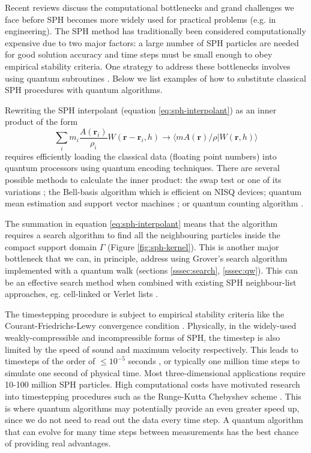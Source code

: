\documentclass[10pt]{iopart}
\begin{document}
Recent reviews \cite{Lind2020,Vacondio2021} discuss the computational bottlenecks and grand challenges we face before SPH becomes more widely used for practical problems (e.g. in engineering). The SPH method has traditionally been considered computationally expensive \cite{Lind2020} due to two major factors: a large number of SPH particles are needed for good solution accuracy and time steps must be small enough to obey empirical stability criteria. One strategy to address these bottlenecks involves using quantum subroutines \cite{AuYeung2024}. Below we list examples of how to substitute classical SPH procedures with quantum algorithms.

Rewriting the SPH interpolant (equation \ref{eq:sph-interpolant}) as an inner product of the form
\begin{equation}
\sum_i m_i \frac{A(\mathbf{r}_i)}{\rho_i} W(\mathbf{r}-\mathbf{r}_i,h) \to
\langle m A(\mathbf{r})/\rho
\vert W(\mathbf{r},h)
\rangle
\end{equation}
requires efficiently loading the classical data (floating point numbers) into quantum processors using quantum encoding techniques. There are several possible methods to calculate the inner product: the swap test \cite{Buhrman2001} or one of its variations \cite{Fanizza2020}; the Bell-basis algorithm \cite{Cincio2018} which is efficient on NISQ devices; quantum mean estimation and support vector machines \cite{Liu2022}; or quantum counting algorithm \cite{Brassard1998,Aaronson2019}.

The summation in equation \ref{eq:sph-interpolant} means that the algorithm requires a search algorithm to find all the neighbouring particles inside the compact support domain $\Gamma$ (Figure \ref{fig:sph-kernel}). This is another major bottleneck that we can, in principle, address using Grover's search algorithm \cite{Grover1996} implemented with a quantum walk (sections \ref{sssec:search}, \ref{sssec:qw}). This can be an effective search method when combined with existing SPH neighbour-list approaches, eg. cell-linked or Verlet lists \cite{Dominguez2011}.

The timestepping procedure is subject to empirical stability criteria like the Courant-Friedrichs-Lewy convergence condition \cite{Courant1967}. Physically, in the widely-used weakly-compressible \cite{Violeau2014} and incompressible \cite{Violeau2015} forms of SPH, the timestep is also limited by the speed of sound and maximum velocity respectively. This leads to timesteps of the order of $\leq 10^{-5}$ seconds \cite{Lind2020}, or typically one million time steps to simulate one second of physical time. Most three-dimensional applications require 10-100 million SPH particles. High computational costs have motivated research into timestepping procedures such as the Runge-Kutta Chebyshev scheme \cite{He2021}. This is where quantum algorithms may potentially provide an even greater speed up, since we do not need to read out the data every time step.  A quantum algorithm that can evolve for many time steps between measurements has the best chance of providing real advantages.
\end{document}
